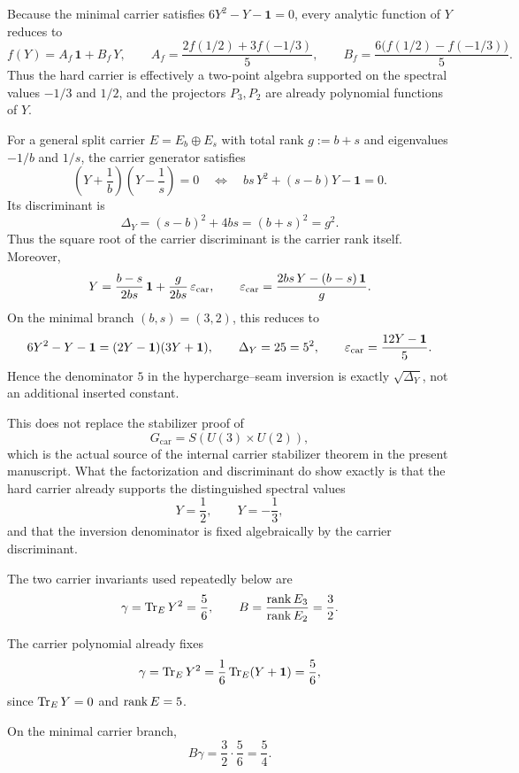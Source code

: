 \begin{remark}
Because the minimal carrier satisfies $6Y^2-Y-\mathbf 1=0$, every analytic function of $Y$ reduces to
\[
f(Y)=A_f\,\mathbf 1+B_f\,Y,
\qquad
A_f=\frac{2f(1/2)+3f(-1/3)}{5},
\qquad
B_f=\frac{6\bigl(f(1/2)-f(-1/3)\bigr)}{5}.
\]
Thus the hard carrier is effectively a two-point algebra supported on the spectral values $-1/3$ and $1/2$, and the projectors $P_3,P_2$ are already polynomial functions of $Y$.
\end{remark}

\begin{remark}\label{rem:carrier-discriminant}
For a general split carrier $E=E_b\oplus E_s$ with total rank $g:=b+s$ and eigenvalues $-1/b$ and $1/s$, the carrier generator satisfies
\[
\left(Y+\frac{1}{b}\right)\left(Y-\frac{1}{s}\right)=0
\quad\Longleftrightarrow\quad
bs\,Y^2+(s-b)Y-\mathbf 1=0.
\]
Its discriminant is
\[
\Delta_Y=(s-b)^2+4bs=(b+s)^2=g^2.
\]
Thus the square root of the carrier discriminant is the carrier rank itself. Moreover,
\[
Y=\frac{b-s}{2bs}\,\mathbf 1+\frac{g}{2bs}\,\varepsilon_{\mathrm{car}},
\qquad
\varepsilon_{\mathrm{car}}=\frac{2bs\,Y-(b-s)\,\mathbf 1}{g}.
\]
On the minimal branch $(b,s)=(3,2)$, this reduces to
\[
6Y^2-Y-\mathbf 1=(2Y-\mathbf 1)(3Y+\mathbf 1),
\qquad
\Delta_Y=25=5^2,
\qquad
\varepsilon_{\mathrm{car}}=\frac{12Y-\mathbf 1}{5}.
\]
Hence the denominator $5$ in the hypercharge--seam inversion is exactly $\sqrt{\Delta_Y}$, not an additional inserted constant.

This does not replace the stabilizer proof of
\[
G_{\mathrm{car}}=S(U(3)\times U(2)),
\]
which is the actual source of the internal carrier stabilizer theorem in the present manuscript.
What the factorization and discriminant do show exactly is that the hard carrier already supports the distinguished spectral values
\[
Y=\frac{1}{2},
\qquad
Y=-\frac{1}{3},
\]
and that the inversion denominator is fixed algebraically by the carrier discriminant.
\end{remark}

The two carrier invariants used repeatedly below are
\[
\gamma=\operatorname{Tr}_EY^2=\frac56,
\qquad
B=\frac{\operatorname{rank} E_3}{\operatorname{rank} E_2}=\frac32.
\]
\begin{corollary}
The carrier polynomial already fixes
\[
\gamma=\operatorname{Tr}_EY^2=\frac16\operatorname{Tr}_E(Y+\mathbf 1)=\frac56,
\]
since $\operatorname{Tr}_EY=0$ and $\operatorname{rank} E=5$.
\end{corollary}

\begin{corollary}
\label{cor:minimal-carrier-compression}
On the minimal carrier branch,
\[
B\gamma=\frac32\cdot\frac56=\frac54.
\]
\end{corollary}

